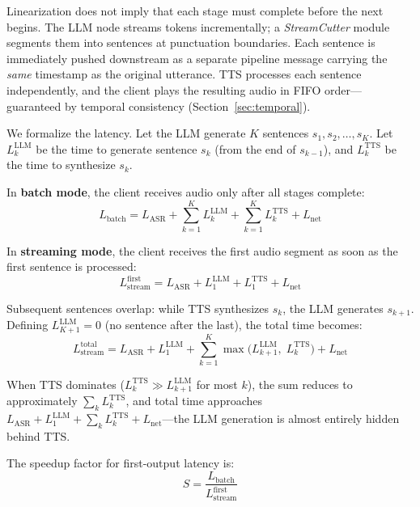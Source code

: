 \documentclass[11pt,a4paper]{article}
\begin{document}
Linearization does not imply that each stage must complete before the next begins. The LLM node streams tokens incrementally; a \textit{StreamCutter} module segments them into sentences at punctuation boundaries. Each sentence is immediately pushed downstream as a separate pipeline message carrying the \emph{same} timestamp as the original utterance. TTS processes each sentence independently, and the client plays the resulting audio in FIFO order---guaranteed by temporal consistency (Section~\ref{sec:temporal}).

We formalize the latency. Let the LLM generate $K$ sentences $s_1, s_2, \ldots, s_K$. Let $L^{\text{LLM}}_k$ be the time to generate sentence $s_k$ (from the end of $s_{k-1}$), and $L^{\text{TTS}}_k$ be the time to synthesize $s_k$.

In \textbf{batch mode}, the client receives audio only after all stages complete:
\begin{equation}
\label{eq:batch}
L_{\text{batch}} = L_{\text{ASR}} + \sum_{k=1}^{K} L^{\text{LLM}}_k + \sum_{k=1}^{K} L^{\text{TTS}}_k + L_{\text{net}}
\end{equation}

In \textbf{streaming mode}, the client receives the first audio segment as soon as the first sentence is processed:
\begin{equation}
\label{eq:stream_first}
L_{\text{stream}}^{\text{first}} = L_{\text{ASR}} + L^{\text{LLM}}_1 + L^{\text{TTS}}_1 + L_{\text{net}}
\end{equation}

Subsequent sentences overlap: while TTS synthesizes $s_k$, the LLM generates $s_{k+1}$. Defining $L^{\text{LLM}}_{K+1} = 0$ (no sentence after the last), the total time becomes:
\begin{equation}
\label{eq:stream_total}
L_{\text{stream}}^{\text{total}} = L_{\text{ASR}} + L^{\text{LLM}}_1 + \sum_{k=1}^{K} \max\!\big(L^{\text{LLM}}_{k+1},\; L^{\text{TTS}}_k\big) + L_{\text{net}}
\end{equation}

When TTS dominates ($L^{\text{TTS}}_k \gg L^{\text{LLM}}_{k+1}$ for most $k$), the sum reduces to approximately $\sum_k L^{\text{TTS}}_k$, and total time approaches $L_{\text{ASR}} + L^{\text{LLM}}_1 + \sum_k L^{\text{TTS}}_k + L_{\text{net}}$---the LLM generation is almost entirely hidden behind TTS.

The speedup factor for first-output latency is:
\begin{equation}
\label{eq:speedup}
S = \frac{L_{\text{batch}}}{L_{\text{stream}}^{\text{first}}}
\end{equation}
\end{document}
